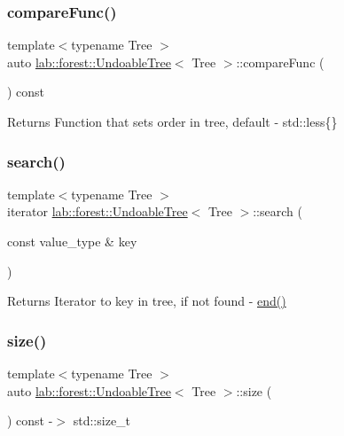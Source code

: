 \subsubsection{\texorpdfstring{compare\+Func()}{compareFunc()}}
{\footnotesize\ttfamily template$<$typename Tree $>$ \\
auto \hyperlink{classlab_1_1forest_1_1UndoableTree}{lab\+::forest\+::\+Undoable\+Tree}$<$ Tree $>$\+::compare\+Func (\begin{DoxyParamCaption}{ }\end{DoxyParamCaption}) const\hspace{0.3cm}{\ttfamily [noexcept]}}

\begin{DoxyReturn}{Returns}
Function that sets order in tree, default -\/ std\+::less\{\} 
\end{DoxyReturn}
\mbox{\label{classlab_1_1forest_1_1UndoableTree_a6e21757708a93c084d55f2b95874d8df}} 
\subsubsection{\texorpdfstring{search()}{search()}}
{\footnotesize\ttfamily template$<$typename Tree $>$ \\
iterator \hyperlink{classlab_1_1forest_1_1UndoableTree}{lab\+::forest\+::\+Undoable\+Tree}$<$ Tree $>$\+::search (\begin{DoxyParamCaption}\item[{const value\+\_\+type \&}]{key }\end{DoxyParamCaption})\hspace{0.3cm}{\ttfamily [noexcept]}}

\begin{DoxyReturn}{Returns}
Iterator to key in tree, if not found -\/ \hyperlink{classlab_1_1forest_1_1UndoableTree_af404b6bb41ddad0291cf2ab22deee478}{end()} 
\end{DoxyReturn}
\mbox{\label{classlab_1_1forest_1_1UndoableTree_a072971d83f1ef40d64f182f0246732ad}} 
\subsubsection{\texorpdfstring{size()}{size()}}
{\footnotesize\ttfamily template$<$typename Tree $>$ \\
auto \hyperlink{classlab_1_1forest_1_1UndoableTree}{lab\+::forest\+::\+Undoable\+Tree}$<$ Tree $>$\+::size (\begin{DoxyParamCaption}{ }\end{DoxyParamCaption}) const -\/$>$  std\+::size\+\_\+t\hspace{0.3cm}{\ttfamily [noexcept]}}

